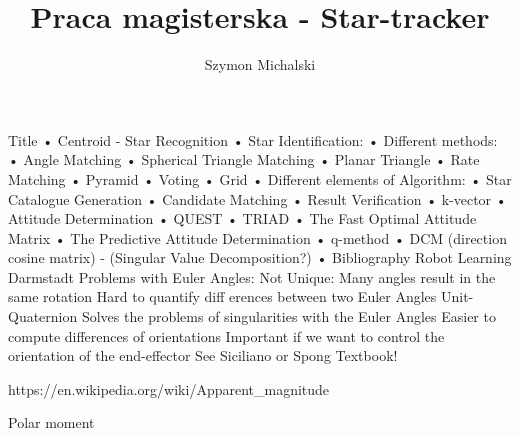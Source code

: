 \documentclass[12pt,a4paper,oneside]{article}
\author{Szymon Michalski}
\title{Praca magisterska - Star-tracker}
\begin{document}
Title
\newline
• Centroid - Star Recognition
\newline
• Star Identification:
\newline
• Different methods:
\newline
• Angle Matching
\newline
• Spherical Triangle Matching
\newline
• Planar Triangle
\newline
• Rate Matching
\newline
• Pyramid
\newline
• Voting
\newline
• Grid
\newline
• Different elements of Algorithm:
\newline
• Star Catalogue Generation
\newline
• Candidate Matching
\newline
• Result Verification
\newline
• k-vector
\newline
• Attitude Determination
\newline
• QUEST
\newline
• TRIAD
\newline
• The Fast Optimal Attitude Matrix
\newline
• The Predictive Attitude Determination
\newline
• q-method
\newline
• DCM (direction cosine matrix) - (Singular Value Decomposition?)
\newline
• Bibliography
\newline\newline
Robot Learning Darmstadt
Problems with Euler Angles:
Not Unique: Many angles result in the same rotation
Hard to quantify diff erences between two Euler Angles
Unit-Quaternion
Solves the problems of singularities with the Euler Angles
Easier to compute differences of orientations
Important if we want to control the orientation of the end-effector
See Siciliano or Spong Textbook!

https://en.wikipedia.org/wiki/Apparent_magnitude

Polar moment
\end{document}
